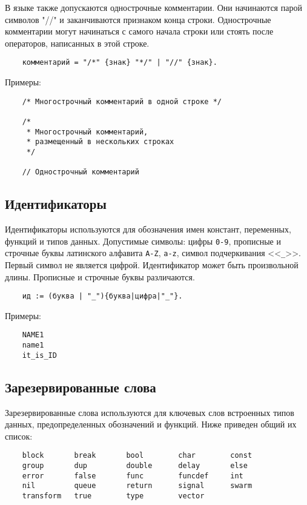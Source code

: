 {В языке также допускаются однострочные комментарии. Они начинаются парой символов "//" и заканчиваются признаком конца строки. Однострочные комментарии могут начинаться с самого начала строки или стоять после операторов, написанных в этой строке.

\begin{verbatim}
    комментарий = "/*" {знак} "*/" | "//" {знак}.
\end{verbatim}

Примеры:

\begin{verbatim}
    /* Многострочный комментарий в одной строке */

    /*
     * Многострочный комментарий,
     * размещенный в нескольких строках
     */

    // Однострочный комментарий
\end{verbatim}

\subsection{Идентификаторы}
\label{smile:elem:id}

Идентификаторы используются для обозначения имен констант, переменных, функций и типов данных. Допустимые символы: цифры \verb|0-9|, прописные и строчные буквы латинского алфавита \verb|A-Z|, \verb|a-z|, символ подчеркивания <<\verb|_|>>. Первый символ не является цифрой. Идентификатор может быть произвольной длины. Прописные и строчные буквы различаются.

\begin{verbatim}
    ид := (буква | "_"){буква|цифра|"_"}.
\end{verbatim}

Примеры:

\begin{verbatim}
    NAME1
    name1
    it_is_ID
\end{verbatim}

\subsection{Зарезервированные слова}

Зарезервированные слова используются для ключевых слов встроенных типов данных, предопределенных обозначений и функций. Ниже приведен общий их список:

\begin{verbatim}
    block       break       bool        char        const
    group       dup         double      delay       else
    error       false       func        funcdef     int
    nil         queue       return      signal      swarm
    transform   true        type        vector
\end{verbatim}

}
